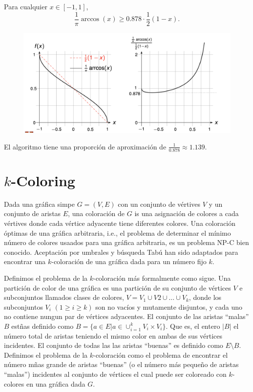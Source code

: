 \documentclass[letterpaper]{article}
\begin{document}
\begin{lemma}
    Para cualquier $x \in [-1,1]$,
    \[
        \frac{1}{\pi} \arccos(x) \geq 0.878 \cdot \frac{1}{2}(1-x).
    \]
    \begin{figure}[H]
        \centering
            \includegraphics[scale=0.5]{6.png}
    \end{figure}
\end{lemma}

\begin{theorem}
    El algoritmo tiene una proporción de aproximación de $\frac{1}{0.878} \approx 1.139$. 
\end{theorem}

\section{$k$-Coloring}
Dada una gráfica simpe $G=(V,E)$ con un conjunto de vértives $V$ y un conjunto de aristas $E$, una
coloración de $G$ is una asignación de colores a cada vértives donde cada vértice adyacente tiene
diferentes colores. Una coloración óptimas de una gráfica arbitraria, i.e., el problema de determinar
el mínimo número de colores usaados para una gráfica arbitraria, es un problema NP-C bien conocido.
Aceptación por umbrales y búsqueda Tabú han sido adaptados para encontrar una $k$-coloración de una
gráfica dada  para un número fijo $k$.

Definimos el problema de la $k$-coloración más formalmente como sigue. Una partición de color de una
gráfica es una partición de su conjunto de vértices $V$ e subconjuntos llamados clases de colores,
$V = V_1 \cup V2 \cup \ldots \cup V_k$, donde los subconjuntos $V_i$ $(1 \geq i \geq k)$ son no vacíos
y mutamente disjuntos, y cada uno no contiene nungun par de vértices adyacentes.
El conjunto de las aristas ``malas'' $B$ estñas definido como
$B = \{ a \in E | a \in \cup_{i=1}^k V_i \times V_i \}$. Que es, el entero $|B|$ el número total de
aristas teniendo el mismo color en ambas de sus vértices incidentes. El conjunto de todas las
las aristas ``buenas'' es definido como $E \setminus B$. Definimos el problema de la $k$-coloración
como el problema de encontrar el número mñas grande de aristas ``buenas'' (o el número más pequeño
de aristas ``malas'') incidentes al conjunto de vértices el cual puede ser coloreado con $k$-colores
en una gráfica dada $G$.
\end{document}
